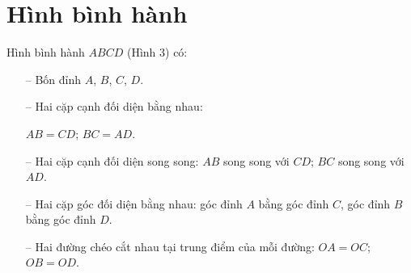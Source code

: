 \documentclass[12pt]{article}
\begin{document}
\section{Hình bình hành}
\begin{paracol}{2}
Hình bình hành \(ABCD\) (Hình 3) có:
\begin{itemize}
  \item[--] Bốn đỉnh \(A\), \(B\), \(C\), \(D\).
  \item[--] Hai cặp cạnh đối diện bằng nhau:
  
  \(AB = CD\); \(BC = AD\).
  \item[--] Hai cặp cạnh đối diện song song: \(AB\) song song với \(CD\); \(BC\) song song với \(AD\).
  \item[--] Hai cặp góc đối diện bằng nhau: góc đỉnh \(A\) bằng góc đỉnh \(C\), góc đỉnh \(B\) bằng góc đỉnh \(D\).
  \item[--] Hai đường chéo cắt nhau tại trung điểm của mỗi đường: \(OA = OC\); \(OB = OD\).
\end{itemize}
\switchcolumn
\centering
{}
\vspace{-\baselineskip}
\end{paracol}
\end{document}
